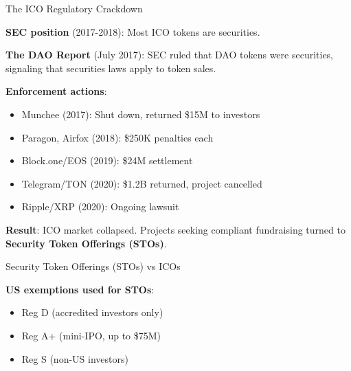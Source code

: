 \documentclass[10pt]{beamer}
\begin{document}
\begin{frame}{The ICO Regulatory Crackdown}
  
  \textbf{SEC position} (2017-2018): Most ICO tokens are securities.
  
  \vspace{0.5em}
  \textbf{The DAO Report} (July 2017): SEC ruled that DAO tokens were securities, signaling that securities laws apply to token sales.
  
  \vspace{0.5em}
  \textbf{Enforcement actions}:
  \begin{itemize}
    \item Munchee (2017): Shut down, returned \$15M to investors
    \item Paragon, Airfox (2018): \$250K penalties each
    \item Block.one/EOS (2019): \$24M settlement
    \item Telegram/TON (2020): \$1.2B returned, project cancelled
    \item Ripple/XRP (2020): Ongoing lawsuit
  \end{itemize}
  
  \vspace{0.5em}
  \textbf{Result}: ICO market collapsed. Projects seeking compliant fundraising turned to \textbf{Security Token Offerings (STOs)}.
\end{frame}

\begin{frame}{Security Token Offerings (STOs) vs ICOs}
  
  \begin{center}
  \end{center}
  
  \vspace{0.5em}
  \textbf{US exemptions used for STOs}:
  \begin{itemize}
    \item Reg D (accredited investors only)
    \item Reg A+ (mini-IPO, up to \$75M)
    \item Reg S (non-US investors)
  \end{itemize}
\end{frame}
\end{document}
